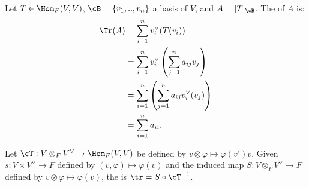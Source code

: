     \begin{definition}
        Let $T \in \Hom_F(V,V)$, $\cB = \{v_1,..,v_n\}$ a basis of $V$, and $A = [T]_\cB$. The  of $A$ is:
            \begin{equation*}
            \begin{split}
                \Tr(A) 
                &= \sum_{i = 1}^n v_i^\vee(T(v_i)) \\
                & = \sum_{i = 1}^n v_i^\vee \left(\sum_{j = 1}^n a_{ij}v_j\right) \\
                & = \sum_{i = 1}^n \left(\sum_{j = 1}^n a_{ij}v_i^\vee (v_j)\right) \\
                & = \sum_{i = 1}^n a_{ii}.
            \end{split}
            \end{equation*}
    \end{definition}

    \begin{definition}
        Let $\cT:V \otimes_F V^\vee \rightarrow \Hom_F(V,V)$ be defined by $v \otimes \varphi \mapsto \varphi(v')v$. Given $s: V \times V^\vee \rightarrow F$ defined by $(v,\varphi) \mapsto \varphi(v)$ and the induced map $S:V \otimes_F V^\vee \rightarrow F$ defined by $v \otimes \varphi \mapsto \varphi(v)$, the  is $\tr = S \circ \cT^{-1} $.
            \begin{center}
            \end{center}
    \end{definition}

